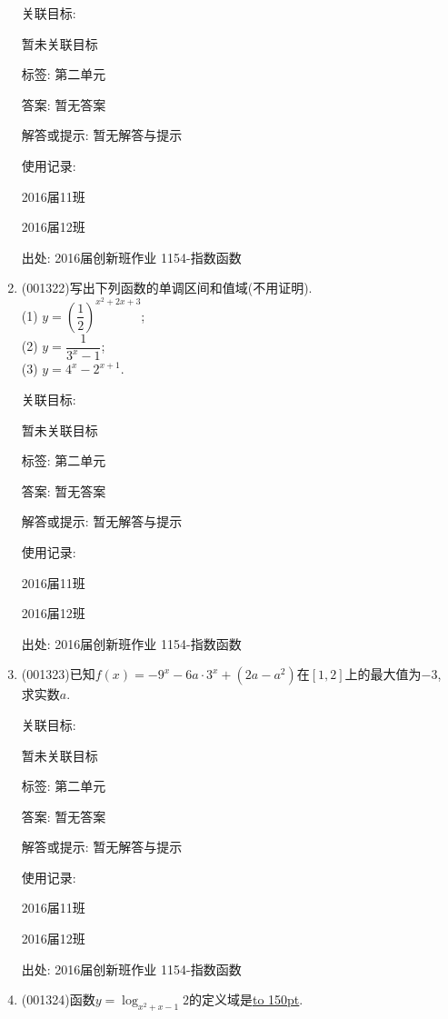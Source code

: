 \documentclass[10pt,a4paper]{article}
\newcommand{\blank}[1]{\underline{\hbox to #1pt{}}}
\begin{document}
\begin{enumerate}[1.]
关联目标:

暂未关联目标



标签: 第二单元

答案: 暂无答案

解答或提示: 暂无解答与提示

使用记录:

2016届11班	

2016届12班	


出处: 2016届创新班作业	1154-指数函数
\item { (001322)}写出下列函数的单调区间和值域(不用证明).\\ 
(1) $y=\left(\dfrac{1}{2}\right)^{x^2+2x+3}$;\\ 
(2) $y=\dfrac{1}{3^x-1}$;\\ 
(3) $y=4^x-2^{x+1}$.


关联目标:

暂未关联目标



标签: 第二单元

答案: 暂无答案

解答或提示: 暂无解答与提示

使用记录:

2016届11班			

2016届12班			


出处: 2016届创新班作业	1154-指数函数
\item { (001323)}已知$f(x)=-9^x-6a\cdot 3^x+(2a-a^2)$在$[1,2]$上的最大值为$-3$, 求实数$a$.


关联目标:

暂未关联目标



标签: 第二单元

答案: 暂无答案

解答或提示: 暂无解答与提示

使用记录:

2016届11班	

2016届12班	


出处: 2016届创新班作业	1154-指数函数
\item { (001324)}函数$y=\log_{x^2+x-1} 2$的定义域是\blank{150}.



\end{enumerate}
\end{document}
